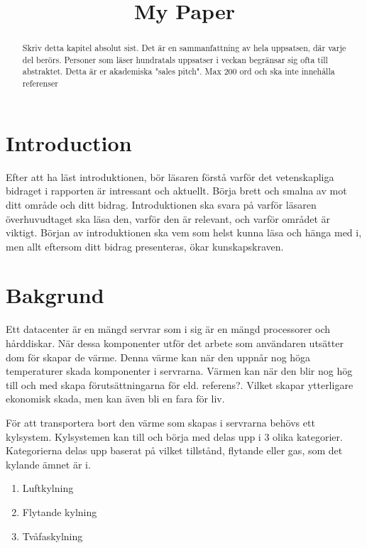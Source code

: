 \documentclass[conference,a4paper]{IEEEtran}
\begin{document}
\title{My Paper}
\author{
}
\maketitle
\begin{abstract}
Skriv detta kapitel absolut sist. Det är en sammanfattning av hela uppsatsen,
där varje del berörs. Personer som läser hundratals uppsatser i veckan begränsar
sig ofta till abstraktet. Detta är er akademiska "sales pitch". Max 200 ord och ska
inte innehålla referenser
\end{abstract}
\section{Introduction}
Efter att ha läst introduktionen, bör läsaren förstå varför det vetenskapliga
bidraget i rapporten är intressant och aktuellt. Börja brett och smalna av mot ditt
område och ditt bidrag. Introduktionen ska svara på varför läsaren överhuvudtaget
ska läsa den, varför den är relevant, och varför området är viktigt. Början av
introduktionen ska vem som helst kunna läsa och hänga med i, men allt eftersom ditt
bidrag presenteras, ökar kunskapskraven.
\section{Bakgrund}
Ett datacenter är en mängd servrar som i sig är en mängd processorer och hårddiskar. 
När dessa komponenter utför det arbete som användaren utsätter dom för skapar de värme. Denna värme kan när 
den uppnår nog höga temperaturer skada komponenter i servrarna. Värmen kan när den blir nog hög till och med
skapa förutsättningarna för eld. referens?. Vilket skapar ytterligare ekonomisk skada, men kan även bli en 
fara för liv. 

För att transportera bort den värme som skapas i servrarna behövs ett kylsystem. Kylsystemen kan till 
och börja med delas upp i 3 olika kategorier. Kategorierna delas upp baserat på vilket tillstånd, 
flytande eller gas, som det kylande ämnet är i. 

\begin{enumerate}
    \item Luftkylning
    \item Flytande kylning 
    \item Tvåfaskylning
\end{enumerate}
\end{document}
